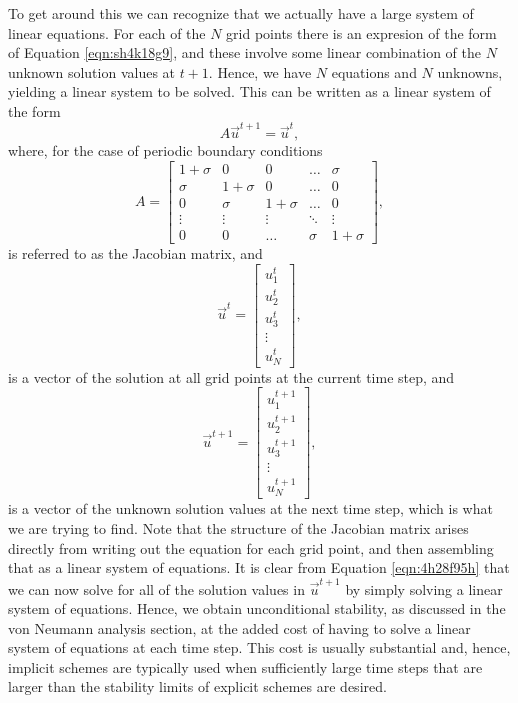 To get around this we can recognize that we actually have a large system of linear equations. For each of the $N$ grid points there is an expresion of the form of Equation \ref{eqn:sh4k18g9}, and these involve some linear combination of the $N$ unknown solution values at $t+1$. Hence, we have $N$ equations and $N$ unknowns, yielding a linear system to be solved. This can be written as a linear system of the form
\begin{equation}
	\label{eqn:4h28f95h}
	A \vec{u}^{t+1} = \vec{u}^{t},
\end{equation} 
where, for the case of periodic boundary conditions
\begin{equation}
	A = 
	\begin{bmatrix}
	    1+\sigma & 0 & 0 & \dots  & \sigma \\
	    \sigma & 1+\sigma & 0 & \dots  & 0 \\
			0 & \sigma & 1+\sigma & \dots  & 0 \\
	    \vdots & \vdots & \vdots & \ddots & \vdots \\
	    0 & 0 & \dots & \sigma  & 1+\sigma
	\end{bmatrix},
\end{equation}
is referred to as the Jacobian matrix, and
\begin{equation}
	\vec{u}^{t} = \begin{bmatrix}
	    u_1^t \\
	    u_2^t \\
		u_3^t \\
	    \vdots  \\
	    u_N^t
	\end{bmatrix},
\end{equation}
is a vector of the solution at all grid points at the current time step, and
\begin{equation}
	\vec{u}^{t+1} = \begin{bmatrix}
	    u_1^{t+1} \\
	    u_2^{t+1} \\
		u_3^{t+1} \\
	    \vdots  \\
	    u_N^{t+1}
	\end{bmatrix},
\end{equation}
is a vector of the unknown solution values at the next time step, which is what we are trying to find. Note that the structure of the Jacobian matrix arises directly from writing out the equation for each grid point, and then assembling that as a linear system of equations. It is clear from Equation \ref{eqn:4h28f95h} that we can now solve for all of the solution values in $\vec{u}^{t+1}$ by simply solving a linear system of equations. Hence, we obtain unconditional stability, as discussed in the von Neumann analysis section, at the added cost of having to solve a linear system of equations at each time step. This cost is usually substantial and, hence, implicit schemes are typically used when sufficiently large time steps that are larger than the stability limits of explicit schemes are desired.

